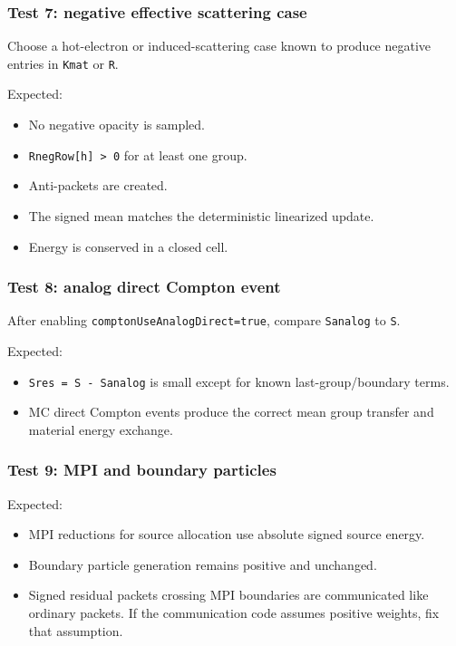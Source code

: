 \documentclass[
]{article}
\providecommand{\tightlist}{%
  \setlength{\itemsep}{0pt}\setlength{\parskip}{0pt}}
\begin{document}
\subsubsection{Test 7: negative effective scattering
case}\label{test-7-negative-effective-scattering-case}

Choose a hot-electron or induced-scattering case known to produce
negative entries in \texttt{Kmat} or \texttt{R}.

Expected:

\begin{itemize}
\tightlist
\item
  No negative opacity is sampled.
\item
  \texttt{RnegRow{[}h{]}\ \textgreater{}\ 0} for at least one group.
\item
  Anti-packets are created.
\item
  The signed mean matches the deterministic linearized update.
\item
  Energy is conserved in a closed cell.
\end{itemize}

\subsubsection{Test 8: analog direct Compton
event}\label{test-8-analog-direct-compton-event}

After enabling \texttt{comptonUseAnalogDirect=true}, compare
\texttt{Sanalog} to \texttt{S}.

Expected:

\begin{itemize}
\tightlist
\item
  \texttt{Sres\ =\ S\ -\ Sanalog} is small except for known
  last-group/boundary terms.
\item
  MC direct Compton events produce the correct mean group transfer and
  material energy exchange.
\end{itemize}

\subsubsection{Test 9: MPI and boundary
particles}\label{test-9-mpi-and-boundary-particles}

Expected:

\begin{itemize}
\tightlist
\item
  MPI reductions for source allocation use absolute signed source
  energy.
\item
  Boundary particle generation remains positive and unchanged.
\item
  Signed residual packets crossing MPI boundaries are communicated like
  ordinary packets. If the communication code assumes positive weights,
  fix that assumption.
\end{itemize}
\end{document}
